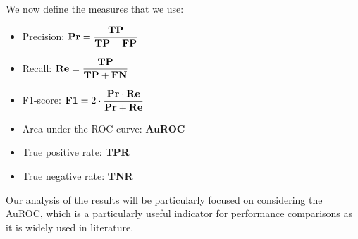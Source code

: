 We now define the measures that we use:
\begin{itemize}
\item Precision: $\displaystyle \textbf{Pr}=\frac{\textbf{TP}}{\textbf{TP}+\textbf{FP}}$
\item Recall: $\displaystyle \textbf{Re}=\frac{\textbf{TP}}{\textbf{TP}+\textbf{FN}}$
\item F1-score: $\displaystyle \textbf{F1}=2\cdot\frac{\textbf{Pr}\cdot\textbf{Re}}{\textbf{Pr}+\textbf{Re}}$
\item Area under the ROC curve: \textbf{AuROC}
\item True positive rate: \textbf{TPR}
\item True negative rate: \textbf{TNR}
\end{itemize}

Our analysis of the results will be particularly focused on considering the AuROC, which is a particularly useful indicator for performance comparisons as it is widely used in literature.


